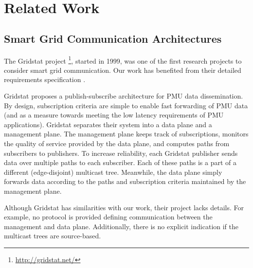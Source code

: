 
\section{Related Work}
\label{sec:related}

\subsection{Smart Grid Communication Architectures}


The Gridstat project \footnote{\url{http://gridstat.net/}}, started in 1999, was one of the first research projects to consider smart grid communication.  
Our work has benefited from their %
detailed requirements specification \cite{Bakken11}.

Gridstat proposes a publish-subscribe architecture for PMU data dissemination. By design, subscription criteria are simple to enable fast forwarding of PMU data
(and as a measure towards meeting the low latency requirements of PMU applications).  
Gridstat separates their system into a data plane and a management plane. The management plane keeps track of subscriptions,
monitors the quality of service provided by the data plane, and computes paths from subscribers to publishers.  To increase reliability, each Gridstat publisher sends data over multiple paths
to each subscriber. Each of these paths is a part of a different (edge-disjoint) multicast tree.  Meanwhile, the data plane simply forwards data according to the paths and subscription 
criteria maintained by the management plane.  

Although Gridstat has similarities with our work, their project lacks details.  For example, no protocol is provided defining communication between the management and data plane. 
Additionally, there is no explicit indication if the multicast trees are source-based.

